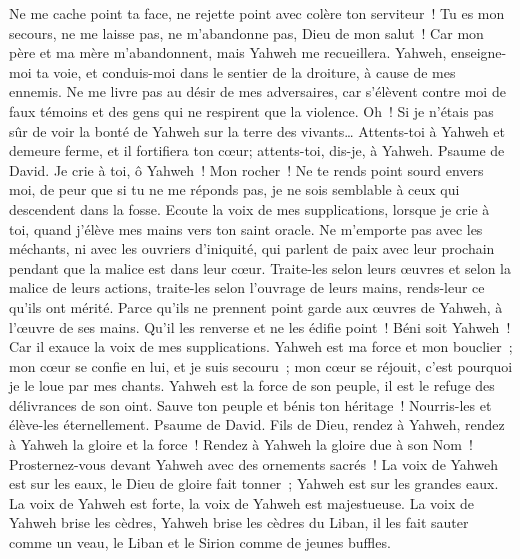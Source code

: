 \begin{multicols}{2}
Ne me cache point ta face, ne rejette point avec colère ton serviteur~! Tu es mon secours, ne me laisse pas, ne m'abandonne pas, Dieu de mon salut~!
Car mon père et ma mère m'abandonnent, mais Yahweh me recueillera.
Yahweh, enseigne-moi ta voie, et conduis-moi dans le sentier de la droiture, à cause de mes ennemis.
Ne me livre pas au désir de mes adversaires, car s'élèvent contre moi de faux témoins et des gens qui ne respirent que la violence.
Oh~! Si je n'étais pas sûr de voir la bonté de Yahweh sur la terre des vivants…
Attents-toi à Yahweh et demeure ferme, et il fortifiera ton cœur; attents-toi, dis-je, à Yahweh. 
\VerseOne{}Psaume de David. Je crie à toi, ô Yahweh~! Mon rocher~! Ne te rends point sourd envers moi, de peur que si tu ne me réponds pas, je ne sois semblable à ceux qui descendent dans la fosse.
Ecoute la voix de mes supplications, lorsque je crie à toi, quand j'élève mes mains vers ton saint oracle.
Ne m'emporte pas avec les méchants, ni avec les ouvriers d'iniquité, qui parlent de paix avec leur prochain pendant que la malice est dans leur cœur.
Traite-les selon leurs œuvres et selon la malice de leurs actions, traite-les selon l'ouvrage de leurs mains, rends-leur ce qu'ils ont mérité.
Parce qu'ils ne prennent point garde aux œuvres de Yahweh, à l'œuvre de ses mains. Qu'il les renverse et ne les édifie point~!
Béni soit Yahweh~! Car il exauce la voix de mes supplications.
Yahweh est ma force et mon bouclier~; mon cœur se confie en lui, et je suis secouru~; mon cœur se réjouit, c'est pourquoi je le loue par mes chants.
Yahweh est la force de son peuple, il est le refuge des délivrances de son oint.
Sauve ton peuple et bénis ton héritage~! Nourris-les et élève-les éternellement.
\VerseOne{}Psaume de David. Fils de Dieu, rendez à Yahweh, rendez à Yahweh la gloire et la force~!
Rendez à Yahweh la gloire due à son Nom~! Prosternez-vous devant Yahweh avec des ornements sacrés~!
La voix de Yahweh est sur les eaux, le Dieu de gloire fait tonner~; Yahweh est sur les grandes eaux.
La voix de Yahweh est forte, la voix de Yahweh est majestueuse.
La voix de Yahweh brise les cèdres, Yahweh brise les cèdres du Liban,
il les fait sauter comme un veau, le Liban et le Sirion comme de jeunes buffles.

\end{multicols}
